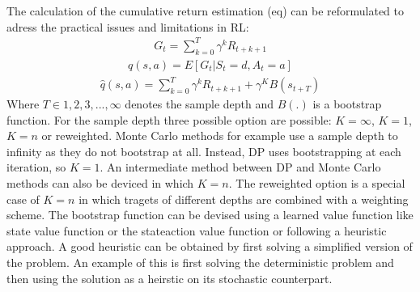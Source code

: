 \documentclass[letterpaper,10pt,english]{jupyterBook}
\begin{document}
\sphinxAtStartPar
The calculation of the cumulative return estimation (eq) can be reformulated to adress the practical issues and limitations in RL:
\begin{equation*}
\begin{split} G_t = \sum_{k=0}^T\gamma^kR_{t+k+1} \end{split}
\end{equation*}\begin{equation*}
\begin{split} q(s,a) = E[G_t| S_t = d, A_t = a]\end{split}
\end{equation*}\begin{equation*}
\begin{split} \hat{q}(s,a) = \sum_{k=0}^T \gamma^kR_{t+k+1} + \gamma^KB(s_{t+T}) \end{split}
\end{equation*}
\sphinxAtStartPar
Where \(T \in {1,2,3, ..., \infty}\) denotes the sample depth and \(B(.)\) is a bootstrap function. For the sample depth three possible option are possible: \(K = \infty\), \(K = 1\),  \(K = n\) or reweighted. Monte Carlo methods for example use a sample depth to infinity as they do not bootstrap at all. Instead, DP uses bootstrapping at each iteration, so \(K = 1\). An intermediate method between DP and Monte Carlo methods can also be deviced in which \( K = n\). The reweighted option is a special case of \( K = n\) in which tragets of different depths are combined with a weighting scheme. The bootstrap function can be devised using a learned value function like state value function or the state\sphinxhyphen{}action value function or following a heuristic approach. A good heuristic can be obtained by first solving a simplified version of the problem. An example of this is first solving the deterministic problem and then using the solution as a heirstic on its stochastic counterpart.
\end{document}
